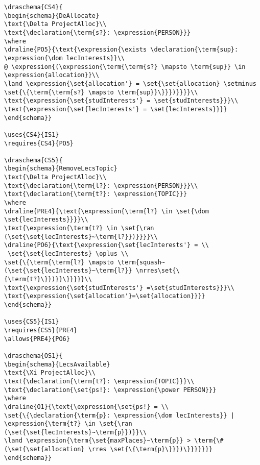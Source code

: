 \begin{verbatim}
\draschema{CS4}{
\begin{schema}{DeAllocate}
\text{\Delta ProjectAlloc}\\
\text{\declaration{\term{s?}: \expression{PERSON}}}
\where
\draline{PO5}{\text{\expression{\exists \declaration{\term{sup}: \expression{\dom lecInterests}}\\
@ \expression{(\expression{\term{\term{s?} \mapsto \term{sup}} \in \expression{allocation}}\\
\land \expression{\set{allocation'} = \set{\set{allocation} \setminus \set{\{\term{\term{s?} \mapsto \term{sup}}\}}})}}}}\\
\text{\expression{\set{studInterests'} = \set{studInterests}}}\\
\text{\expression{\set{lecInterests'} = \set{lecInterests}}}}
\end{schema}}

\uses{CS4}{IS1}
\requires{CS4}{PO5}

\draschema{CS5}{
\begin{schema}{RemoveLecsTopic}
\text{\Delta ProjectAlloc}\\
\text{\declaration{\term{l?}: \expression{PERSON}}}\\
\text{\declaration{\term{t?}: \expression{TOPIC}}}
\where
\draline{PRE4}{\text{\expression{\term{l?} \in \set{\dom \set{lecInterests}}}}\\
\text{\expression{\term{t?} \in \set{\ran (\set{\set{lecInterests}~\term{l?}})}}}}\\
\draline{PO6}{\text{\expression{\set{lecInterests'} = \\
 \set{\set{lecInterests} \oplus \\
\set{\{\term{\term{l?} \mapsto \term{squash~(\set{\set{lecInterests}~\term{l?}} \nrres\set{\{\term{t?}\}})}}\}}}}}\\
\text{\expression{\set{studInterests'} =\set{studInterests}}}\\
\text{\expression{\set{allocation'}=\set{allocation}}}}
\end{schema}}

\uses{CS5}{IS1}
\requires{CS5}{PRE4}
\allows{PRE4}{PO6}

\draschema{OS1}{
\begin{schema}{LecsAvailable}
\text{\Xi ProjectAlloc}\\
\text{\declaration{\term{t?}: \expression{TOPIC}}}\\
\text{\declaration{\set{ps!}: \expression{\power PERSON}}}
\where
\draline{O1}{\text{\expression{\set{ps!} = \\
\set{\{\declaration{\term{p}: \expression{\dom lecInterests}} | \expression{\term{t?} \in \set{\ran (\set{\set{lecInterests}~\term{p}})}}\\
\land \expression{\term{\set{maxPlaces}~\term{p}} > \term{\# (\set{\set{allocation} \rres \set{\{\term{p}\}}})\}}}}}}}
\end{schema}}


\end{verbatim}
